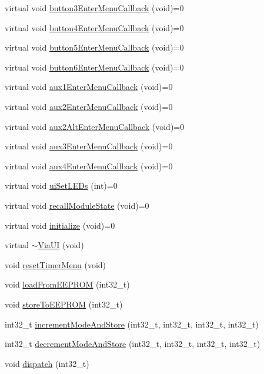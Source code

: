 \begin{DoxyCompactItemize}
\item 
virtual void \mbox{\hyperlink{class_via_u_i_a883081e46324dec82ad89f2e77cf4b65}{button3\+Enter\+Menu\+Callback}} (void)=0
\item 
virtual void \mbox{\hyperlink{class_via_u_i_a6db24e53e559b6fddd4cb1f918de40d6}{button4\+Enter\+Menu\+Callback}} (void)=0
\item 
virtual void \mbox{\hyperlink{class_via_u_i_adb40844fb1fa8e623f3a7eaecdbfad53}{button5\+Enter\+Menu\+Callback}} (void)=0
\item 
virtual void \mbox{\hyperlink{class_via_u_i_ae59e7ff3a6ba1f641a4a916e47a26513}{button6\+Enter\+Menu\+Callback}} (void)=0
\item 
virtual void \mbox{\hyperlink{class_via_u_i_a578111861e912bf43d3f320a0faffb0f}{aux1\+Enter\+Menu\+Callback}} (void)=0
\item 
virtual void \mbox{\hyperlink{class_via_u_i_a1f51fc259471364f91bd0a1592824dab}{aux2\+Enter\+Menu\+Callback}} (void)=0
\item 
virtual void \mbox{\hyperlink{class_via_u_i_a08a746b666d37ac6bc293303187fd6be}{aux2\+Alt\+Enter\+Menu\+Callback}} (void)=0
\item 
virtual void \mbox{\hyperlink{class_via_u_i_aa62c9f8dc58d37fc2a3abc7bce1cd16e}{aux3\+Enter\+Menu\+Callback}} (void)=0
\item 
virtual void \mbox{\hyperlink{class_via_u_i_a36cc4bac8f774c2a59ab8635be05f884}{aux4\+Enter\+Menu\+Callback}} (void)=0
\item 
virtual void \mbox{\hyperlink{class_via_u_i_a4bd3d575f4efe1273d6e4645454ead52}{ui\+Set\+L\+E\+Ds}} (int)=0
\item 
virtual void \mbox{\hyperlink{class_via_u_i_ac5b88708650fe41ea955c77de580f6f5}{recall\+Module\+State}} (void)=0
\item 
virtual void \mbox{\hyperlink{class_via_u_i_a573ba7aef8f4982ec4900258c770bdbb}{initialize}} (void)=0
\item 
virtual \mbox{\hyperlink{class_via_u_i_ad60e005bc6a105009be39325664e5a32}{$\sim$\+Via\+UI}} (void)
\item 
void \mbox{\hyperlink{class_via_u_i_ac7abd4e9e7fa598dedab8b4c2486d010}{reset\+Timer\+Menu}} (void)
\item 
void \mbox{\hyperlink{class_via_u_i_aecfaa511595dcab4d38caff73abdd54b}{load\+From\+E\+E\+P\+R\+OM}} (int32\+\_\+t)
\item 
void \mbox{\hyperlink{class_via_u_i_a09fbb5e879fb9e2e77c4642dae4ab83a}{store\+To\+E\+E\+P\+R\+OM}} (int32\+\_\+t)
\item 
int32\+\_\+t \mbox{\hyperlink{class_via_u_i_a301e1692cc55b1ee55ba0133b5308f87}{increment\+Mode\+And\+Store}} (int32\+\_\+t, int32\+\_\+t, int32\+\_\+t, int32\+\_\+t)
\item 
int32\+\_\+t \mbox{\hyperlink{class_via_u_i_a85d24875e904ac7cf63f0762e1ccb3c0}{decrement\+Mode\+And\+Store}} (int32\+\_\+t, int32\+\_\+t, int32\+\_\+t, int32\+\_\+t)
\item 
void \mbox{\hyperlink{class_via_u_i_ae8bb5e76df4a1b3c1127829bd1be21f7}{dispatch}} (int32\+\_\+t)
\end{DoxyCompactItemize}
